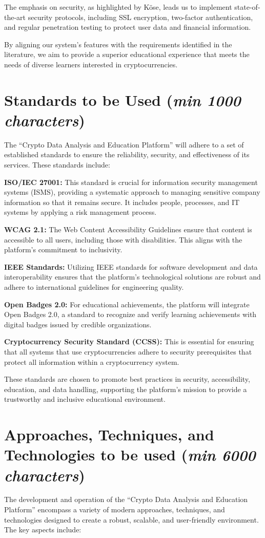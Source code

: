 \documentclass[12pt]{report}
\newcommand{\characters}[1]{(\textit{min #1 characters})}
\begin{document}
The emphasis on security, as highlighted by Köse, leads us to implement state-of-the-art security protocols, including SSL encryption, two-factor authentication, and regular penetration testing to protect user data and financial information.

By aligning our system's features with the requirements identified in the literature, we aim to provide a superior educational experience that meets the needs of diverse learners interested in cryptocurrencies.


\section{Standards to be Used \characters{1000}}
The ``Crypto Data Analysis and Education Platform'' will adhere to a set of established standards to ensure the reliability, security, and effectiveness of its services. These standards include:

\textbf{ISO/IEC 27001:} This standard is crucial for information security management systems (ISMS), providing a systematic approach to managing sensitive company information so that it remains secure. It includes people, processes, and IT systems by applying a risk management process.

\textbf{WCAG 2.1:} The Web Content Accessibility Guidelines ensure that content is accessible to all users, including those with disabilities. This aligns with the platform's commitment to inclusivity.

\textbf{IEEE Standards:} Utilizing IEEE standards for software development and data interoperability ensures that the platform's technological solutions are robust and adhere to international guidelines for engineering quality.

\textbf{Open Badges 2.0:} For educational achievements, the platform will integrate Open Badges 2.0, a standard to recognize and verify learning achievements with digital badges issued by credible organizations.

\textbf{Cryptocurrency Security Standard (CCSS):} This is essential for ensuring that all systems that use cryptocurrencies adhere to security prerequisites that protect all information within a cryptocurrency system.

These standards are chosen to promote best practices in security, accessibility, education, and data handling, supporting the platform’s mission to provide a trustworthy and inclusive educational environment.

\section{Approaches, Techniques, and Technologies to be used \characters{6000}}
The development and operation of the ``Crypto Data Analysis and Education Platform'' encompass a variety of modern approaches, techniques, and technologies designed to create a robust, scalable, and user-friendly environment. The key aspects include:
\end{document}
